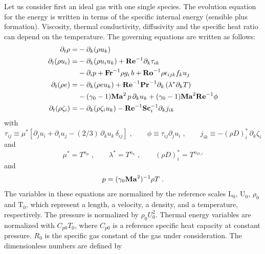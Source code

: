 Let us consider first an ideal gas with one single species. The evolution equation for the energy is written in terms of the specific internal energy (sensible plus formation). Viscosity, thermal conductivity, diffusivity and the specific heat ratio can depend on the temperature. The governing equations are written as follows:
\begin{subequations}
    \begin{align}
        \partial_t \rho       =& -\partial_k (\rho u_k)                                       \\
        \partial_t (\rho u_i) =& -\partial_k (\rho u_i u_k )+\mathrm{\bf Re}^{-1}\partial_k \tau_{ik}   \nonumber \\
        &  - \partial_i p +\mathrm{\bf Fr}^{-1} \rho g_i\,b +\mathrm{\bf Ro}^{-1}\rho\epsilon_{ijk} f_ku_j                         \\
        \partial_t (\rho e)   =& -\partial_k (\rho e u_k ) +\mathrm{\bf Re}^{-1}\mathrm{\bf Pr}^{-1} \partial_k \left(\lambda^{*}\partial_kT\right) \nonumber \\
        &-(\gamma_0-1)\mathrm{\bf Ma}^2\,p\, \partial_k u_k  + (\gamma_0-1)\mathrm{\bf Ma}^2\mathrm{\bf Re}^{-1}\phi           \\
        \partial_t (\rho \zeta_i) =& -\partial_k (\rho \zeta_i u_k)-\mathrm{\bf Re}^{-1}\mathrm{\bf Sc}_i^{-1} \partial_k j_{ik}
    \end{align}
\end{subequations}
with
\begin{equation}
    \tau_{ij} \equiv \mu^*\left[\partial_j u_i +\partial_i u_j -(2/3)\, \partial_k u_k\,\delta_{ij}\right]\;,\qquad
    \phi      \equiv \tau_{ij} \partial_j u_i\;,\qquad
    j_{ik}    \equiv -(\rho D)_i^{*}\, \partial_k \zeta_i
\end{equation}
and
\begin{equation}
    \mu^{*} =  T^{n_\mu}\;,\qquad \lambda^{*} = T^{n_\kappa} \;,\qquad (\rho D)_i^{*}  =  T^{n_{D,i}}
\end{equation}
and
\begin{equation}
    p  = (\gamma_0 \mathrm{\bf Ma}^2)^{-1}\rho T \;.
    \label{eq:state}
\end{equation}
The variables in these equations are normalized by the reference scales $\mathrm{L}_0$, $\mathrm{U}_0$, $\rho_0$ and $\mathrm{T}_0$, which represent a length, a velocity, a density, and a temperature, respectively. The pressure is normalized by $\rho_0U_0^2$. Thermal energy variables are normalized with $C_{p0}T_0$, where $C_{p0}$ is a reference specific heat capacity at constant pressure. $R_0$ is the specific gas constant of the gas under consideration. The dimensionless numbers are defined by
